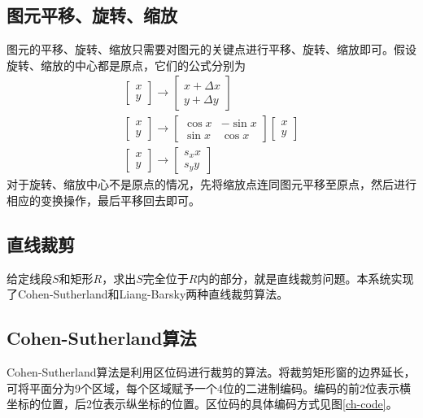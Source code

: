 \documentclass[a4paper,12pt]{article}
\begin{document}
\subsection{图元平移、旋转、缩放}
图元的平移、旋转、缩放只需要对图元的关键点进行平移、旋转、缩放即可。假设旋转、缩放的中心都是原点，它们的公式分别为
\begin{gather}
\begin{bmatrix} x \\ y \end{bmatrix} \rightarrow \begin{bmatrix} x + \Delta x \\ y + \Delta y \end{bmatrix} \\
\begin{bmatrix} x \\ y \end{bmatrix} \rightarrow \begin{bmatrix} \cos x & -\sin x \\ \sin x & \cos x  \end{bmatrix} \begin{bmatrix} x \\ y  \end{bmatrix} \\
\begin{bmatrix} x \\ y \end{bmatrix} \rightarrow \begin{bmatrix} s_x x \\ s_y y  \end{bmatrix}
\end{gather}
对于旋转、缩放中心不是原点的情况，先将缩放点连同图元平移至原点，然后进行相应的变换操作，最后平移回去即可。

\subsection{直线裁剪}
给定线段$S$和矩形$R$，求出$S$完全位于$R$内的部分，就是直线裁剪问题。本系统实现了Cohen-Sutherland和Liang-Barsky两种直线裁剪算法。

\subsection{Cohen-Sutherland算法}
Cohen-Sutherland算法是利用区位码进行裁剪的算法。将裁剪矩形窗的边界延长，可将平面分为9个区域，每个区域赋予一个4位的二进制编码。编码的前2位表示横坐标的位置，后2位表示纵坐标的位置。区位码的具体编码方式见图\ref{ch-code}。
\end{document}
